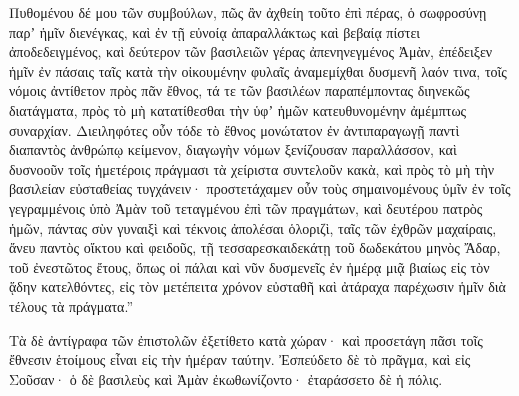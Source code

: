 {Πυθομένου δέ μου τῶν συμβούλων, πῶς ἂν ἀχθείη τοῦτο ἐπὶ πέρας, ὁ σωφροσύνῃ παρʼ ἡμῖν διενέγκας, καὶ ἐν τῇ εὐνοίᾳ ἀπαραλλάκτως καὶ βεβαίᾳ πίστει ἀποδεδειγμένος, καὶ δεύτερον τῶν βασιλειῶν γέρας ἀπενηνεγμένος Ἀμὰν,
ἐπέδειξεν ἡμῖν ἐν πάσαις ταῖς κατὰ τὴν οἰκουμένην φυλαῖς ἀναμεμίχθαι δυσμενῆ λαόν τινα, τοῖς νόμοις ἀντίθετον πρὸς πᾶν ἔθνος, τά τε τῶν βασιλέων παραπέμποντας διηνεκῶς διατάγματα, πρὸς τὸ μὴ κατατίθεσθαι τὴν ὑφʼ ἡμῶν κατευθυνομένην ἀμέμπτως συναρχίαν.
Διειληφότες οὖν τόδε τὸ ἔθνος μονώτατον ἐν ἀντιπαραγωγῇ παντὶ διαπαντὸς ἀνθρώπῳ κείμενον, διαγωγὴν νόμων ξενίζουσαν παραλλάσσον, καὶ δυσνοοῦν τοῖς ἡμετέροις πράγμασι τὰ χείριστα συντελοῦν κακὰ, καὶ πρὸς τὸ μὴ τὴν βασιλείαν εὐσταθείας τυγχάνειν·
προστετάχαμεν οὖν τοὺς σημαινομένους ὑμῖν ἐν τοῖς γεγραμμένοις ὑπὸ Ἀμὰν τοῦ τεταγμένου ἐπὶ τῶν πραγμάτων, καὶ δευτέρου πατρὸς ἡμῶν, πάντας σὺν γυναιξὶ καὶ τέκνοις ἀπολέσαι ὁλοριζὶ, ταῖς τῶν ἐχθρῶν μαχαίραις, ἄνευ παντὸς οἴκτου καὶ φειδοῦς, τῇ τεσσαρεσκαιδεκάτῃ τοῦ δωδεκάτου μηνὸς Ἄδαρ, τοῦ ἐνεστῶτος ἔτους,
ὅπως οἱ πάλαι καὶ νῦν δυσμενεῖς ἐν ἡμέρᾳ μιᾷ βιαίως εἰς τὸν ᾅδην κατελθόντες, εἰς τὸν μετέπειτα χρόνον εὐσταθῆ καὶ ἀτάραχα παρέχωσιν ἡμῖν διὰ τέλους τὰ πράγματα.”
\par }{\PP {}Τὰ δὲ ἀντίγραφα τῶν ἐπιστολῶν ἐξετίθετο κατὰ χώραν· καὶ προσετάγη πᾶσι τοῖς ἔθνεσιν ἑτοίμους εἶναι εἰς τὴν ἡμέραν ταύτην.
Ἐσπεύδετο δὲ τὸ πρᾶγμα, καὶ εἰς Σοῦσαν· ὁ δὲ βασιλεὺς καὶ Ἀμὰν ἐκωθωνίζοντο· ἐταράσσετο δὲ ἡ πόλις.

}
